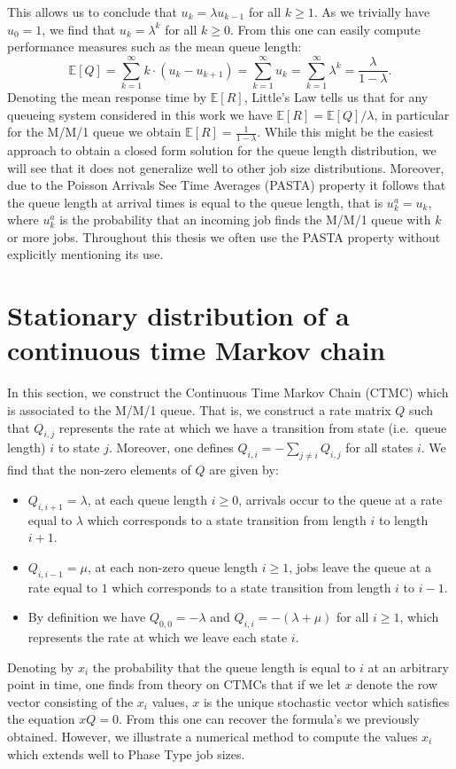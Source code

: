 \documentclass[12pt]{report}
\newcommand{\E}{\mathbb{E}}
\begin{document}
\begin{appendices}
$$$$
This allows us to conclude that $u_k = \lambda u_{k-1}$ for all $k \geq 1$. As we trivially have $u_0=1$, we find that $u_k = \lambda^k$ for all $k \geq 0$. From this one can easily compute performance measures such as the mean queue length:
$$
\E[Q] = \sum_{k=1}^\infty k \cdot (u_k - u_{k+1}) = \sum_{k = 1}^\infty u_k = \sum_{k=1}^\infty \lambda^k = \frac{\lambda}{1-\lambda}.
$$
Denoting the mean response time by $\E[R]$, Little's Law tells us that for any queueing system considered in this work we have $\E[R] = \E[Q]/\lambda$, in particular for the M/M/1 queue we obtain $\E[R] = \frac{1}{1-\lambda}$. While this might be the easiest approach to obtain a closed form solution for the queue length distribution, we will see that it does not generalize well to other job size distributions. Moreover, due to the Poisson Arrivals See Time Averages (PASTA) property it follows that the queue length at arrival times is equal to the queue length, that is $u_k^a = u_k$, where $u_k^a$ is the probability that an incoming job finds the M/M/1 queue with $k$ or more jobs. Throughout this thesis we often use the PASTA property without explicitly mentioning its use.

\section{Stationary distribution of a continuous time Markov chain} \label{sec:MM1_CTMC}
In this section, we construct the Continuous Time Markov Chain (CTMC) which is associated to the M/M/1 queue. That is, we construct a rate matrix $Q$ such that $Q_{i,j}$ represents the rate at which we have a transition from state (i.e.~queue length) $i$ to state $j$. Moreover, one defines $Q_{i,i} = -\sum_{j\neq i} Q_{i,j}$ for all states $i$. We find that the non-zero elements of $Q$ are given by:
\begin{itemize}
\item $Q_{i,i+1} = \lambda$, at each queue length $i \geq 0$, arrivals occur to the queue at a rate equal to $\lambda$ which corresponds to a state transition from length $i$ to length $i+1$.
\item $Q_{i,i-1} = \mu$, at each non-zero queue length $i \geq 1$, jobs leave the queue at a rate equal to $1$ which corresponds to a state transition from length $i$ to $i-1$.
\item By definition we have $Q_{0,0} = -\lambda$ and $Q_{i,i} = -(\lambda + \mu)$ for all $i\geq 1$, which represents the rate at which we leave each state $i$.
\end{itemize}
Denoting by $x_i$ the probability that the queue length is equal to $i$ at an arbitrary point in time, one finds from theory on CTMCs that if we let $x$ denote the row vector consisting of the $x_i$ values, $x$ is the unique stochastic vector which satisfies the equation $xQ = 0$. From this one can recover the formula's we previously obtained. However, we illustrate a numerical method to compute the values $x_i$ which extends well to Phase Type job sizes. 


\end{appendices}
\end{document}
